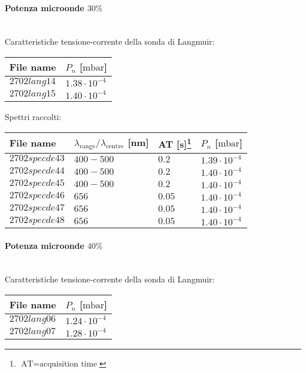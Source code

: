 \paragraph*{Potenza microonde $\text{30\%}$} ~\\
Caratteristiche tensione-corrente della sonda di Langmuir:
\begin{center}
  \begin{tabular}{p{3cm}p{3cm}}
  \toprule
File name	&$P_{n}$ [$\si{\milli\bar}$]\\
  \midrule
$2702lang14$	&$1.38\cdot10^{-4}$\\
$2702lang15$	&$1.40\cdot10^{-4}$\\
  \bottomrule
  \end{tabular}
\end{center}

Spettri raccolti:
\begin{center}
\begin{tabular}{p{3cm}p{4cm}p{2cm}p{3cm}}
\toprule
File name	&$\lambda_\text{range}\text{/}\lambda_\text{centre}$ [nm] &AT [s]\footnote{$\text{AT}=\text{acquisition time}$} &$P_{n}$ [$\si{\milli\bar}$]\\
\midrule
$2702specde43$	&$400-500$	&$0.2$		&$1.39\cdot10^{-4}$\\
$2702specde44$	&$400-500$	&$0.2$		&$1.40\cdot10^{-4}$\\
$2702specde45$	&$400-500$	&$0.2$		&$1.40\cdot10^{-4}$\\
$2702specde46$	&$656$		&$0.05$		&$1.40\cdot10^{-4}$\\
$2702specde47$	&$656$		&$0.05$		&$1.40\cdot10^{-4}$\\
$2702specde48$	&$656$		&$0.05$		&$1.40\cdot10^{-4}$\\

\bottomrule
\end{tabular}
\end{center}

\paragraph*{Potenza microonde $\text{40\%}$} ~\\
Caratteristiche tensione-corrente della sonda di Langmuir:
\begin{center}
\begin{tabular}{p{3cm}p{3cm}}
\toprule
File name	&$P_n$ [$\si{\milli\bar}$]\\
\midrule
$2702lang06$	&$1.24\cdot10^{-4}$\\
$2702lang07$	&$1.28\cdot10^{-4}$\\
\bottomrule
\end{tabular}
\end{center}

